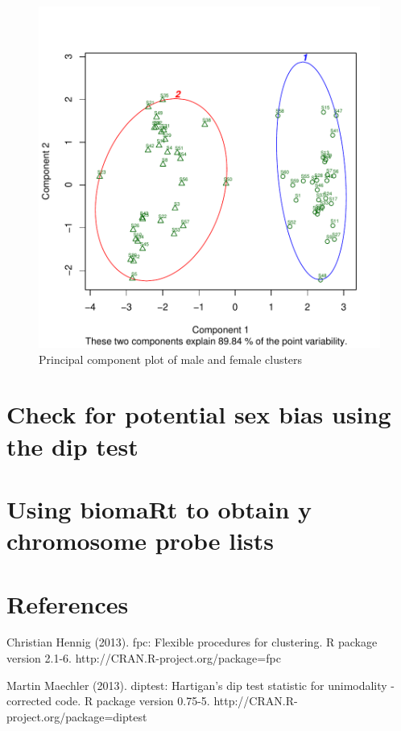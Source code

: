 \documentclass{article}
\begin{document}
\begin{figure}
\begin{center}
\includegraphics{massiR_vignette-fig4}
\end{center}
\caption{Principal component plot of male and female clusters}
\label{fig:fig4}
\end{figure}

\clearpage

\section{Check for potential sex bias using the dip test}

\section{Using biomaRt to obtain y chromosome probe lists}

\clearpage

\section{References}
  Christian Hennig (2013). fpc: Flexible procedures for clustering.
  R package version 2.1-6.
  http://CRAN.R-project.org/package=fpc
  
  Martin Maechler (2013). diptest: Hartigan's dip test statistic for unimodality - 
  corrected code.
  R package version 0.75-5. http://CRAN.R-project.org/package=diptest
  
\end{document}
